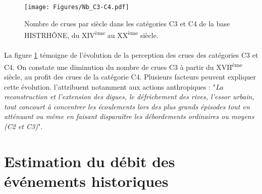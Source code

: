 \documentclass[11pt]{article}
\begin{document}
	\begin{figure}[h]
	\centering
		\texttt{[image: Figures/Nb\_C3-C4.pdf]}
        \caption{Nombre de crues par siècle dans les catégories C3 et C4 de la base HISTRHÔNE, du XIV\textsuperscript{ème} au XX\textsuperscript{ème} siècle.}
		\label{fig:Nb_C3C4}
	\end{figure}	
	
	\paragraph{} La figure \ref{fig:Nb_C3C4} témoigne de l'évolution de la perception des crues des catégories C3 et C4. On constate une diminution du nombre de crues C3 à partir du XVII\textsuperscript{ème} siècle, au profit des crues de la catégorie C4. Plusieurs facteurs peuvent expliquer cette évolution. \citet{pichard_sept_2014} l'attribuent notamment aux actions anthropiques : "\textit{La reconstruction et l'extension des digues, le défrichement des rives, l'essor urbain, tout concourt à concentrer les écoulements lors des plus grands épisodes tout en atténuant ou même en faisant disparaître les débordements ordinaires ou moyens (C2 et C3)}".
	
\FloatBarrier

\section{Estimation du débit des événements historiques}
\end{document}
